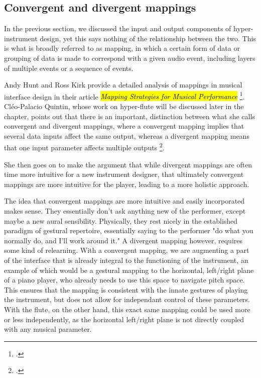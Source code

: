\documentclass[12pt,twoside,maitrise]{dms_ks}
\theoremstyle{definition}
\begin{document}
{\subsection{Convergent and divergent mappings}

In the previous section, we discussed the input and output components of hyper-instrument design, yet this says nothing of the relationship between the two.
This is what is broadly referred to as mapping, in which a certain form of data or grouping of data is made to correspond with a given audio event, including layers of multiple events or a sequence of events. 

Andy Hunt and Ross Kirk provide a detailed analysis of mappings in musical interface design in their article \hl{\textit{Mapping Strategies for Musical Performance}} \footcite{hunt_mapping_2000}.
Cléo-Palacio Quintin, whose work on hyper-flute will be discussed later in the chapter, points out that there is an important, distinction between what she calls convergent and divergent mappings, where a convergent mapping implies that several data inputs affect the same output, whereas a divergent mapping means that one input parameter affects multiple outputs \footcite[44--45]{palacio-quintin_composition_2012-1}. 


She then goes on to make the argument that while divergent mappings are often time more intuitive for a new instrument designer, that ultimately convergent mappings are more intuitive for the player, leading to a more holistic approach. 


The idea that convergent mappings are more intuitive and easily incorporated makes sense. 
They essentially don't ask anything new of the performer, except maybe a new aural sensibility. 
Physically, they rest nicely in the established paradigm of gestural repertoire, essentially saying to the performer "do what you normally do, and I'll work around it." A divergent mapping however, requires some kind of relearning. 
With a convergent mapping, we are augmenting a part of the interface that is already integral to the functioning of the instrument, an example of which would be a gestural mapping to the horizontal, left/right plane of a piano player, who already needs to use this space to navigate pitch space.
This ensures that the mapping is consistent with the innate gestures of playing the instrument, but does not allow for independant control of these parameters.
With the flute, on the other hand, this exact same mapping could be used more or less independently, as the horizontal left/right plane is not directly coupled with any musical parameter.

}
\end{document}
